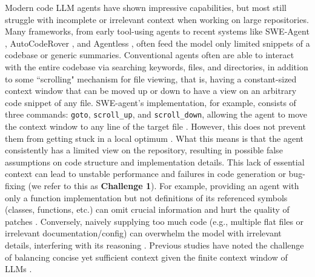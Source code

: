 Modern code LLM agents have shown impressive capabilities, but most still struggle with incomplete or irrelevant context when working on large repositories. Many frameworks, from early tool-using agents to recent systems like SWE-Agent \cite{yang2024sweagent}, AutoCodeRover \cite{zhang2024autocoderover}, and Agentless \cite{xia2024agentlessdemystifyingllmbasedsoftware}, often feed the model only limited snippets of a codebase or generic summaries. Conventional agents often are able to interact with the entire codebase via searching keywords, files, and directories, in addition to some ``scrolling" mechanism for file viewing, { that is, having a constant-sized context window that can be moved up or down to have a view on an arbitrary code snippet of any file. SWE-agent's implementation, for example, consists of three commands: \verb|goto|, \verb|scroll_up|, and \verb|scroll_down|, allowing the agent to move the context window to any line of the target file \cite{yang2024sweagent}}. However, this does not prevent them from getting stuck in a local optimum \cite{ouyang2025repographenhancingaisoftware} . { What this means is that the agent consistently has a limited view on the repository, resulting in possible false assumptions on code structure and implementation details.} This lack of essential context can lead to unstable performance and failures in code generation or bug-fixing (we refer to this as \textbf{Challenge 1}). For example, providing an agent with only a function implementation but not definitions of its referenced symbols (classes, functions, etc.) can omit crucial information and hurt the quality of patches . Conversely, naively supplying too much code (e.g., multiple flat files or irrelevant documentation/config) can overwhelm the model with irrelevant details, interfering with its reasoning \cite{zhang2024hierarchicalcontextpruningoptimizing, zhang2024inftybenchextendinglongcontext}. Previous studies have noted the challenge of balancing concise yet sufficient context given the finite context window of LLMs \cite{ouyang2025repographenhancingaisoftware}.

